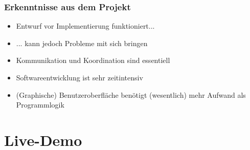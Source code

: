 \documentclass[t]{beamer}
\begin{document}
\begin{frame}
    \frametitle{Erkenntnisse aus dem Projekt}
    \begin{itemize}
        \item<+-> Entwurf vor Implementierung funktioniert...
        \item<+-> ... kann jedoch Probleme mit sich bringen
        \item<+-> Kommunikation und Koordination sind essentiell
        \item<+-> Softwareentwicklung ist sehr zeitintensiv
        \item<+-> (Graphische) Benutzeroberfläche benötigt (wesentlich) mehr Aufwand als Programmlogik
    \end{itemize}
\end{frame}

\section{Live-Demo}
\end{document}
